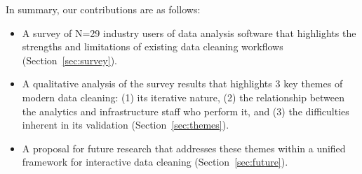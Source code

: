 In summary, our contributions are as follows:
\begin{itemize}
\item A survey of N=29 industry users of data analysis software that highlights the strengths and limitations of existing data cleaning workflows (Section~\ref{sec:survey}).
\item A qualitative analysis of the survey results that highlights 3 key themes of modern data cleaning: (1) its iterative nature, (2) the relationship between the analytics and infrastructure staff who perform it, and (3) the difficulties inherent in its validation (Section~\ref{sec:themes}).
\item A proposal for future research that addresses these themes within a unified framework for interactive data cleaning (Section~\ref{sec:future}).
\end{itemize}
